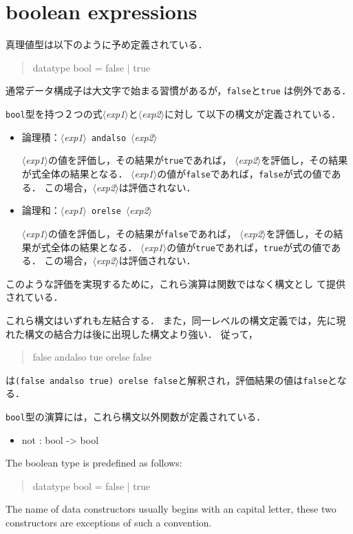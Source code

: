 \documentclass{jbook}
\newcommand{\txt}[2]{#2}
\newcommand{\code}[1]{\mbox{\large\tt #1}}
\newcommand{\nonterm}[1]{\mbox{$\langle$}{\it #1}\mbox{$\rangle$}}
\newcommand{\term}[1]{\mbox{{\tt #1}}}
\newenvironment{program}{\begin{quote}\begin{tt}}%
                        {\end{tt}\end{quote}}
\begin{document}
\section{\txt{論理演算式}{boolean expressions}}

\ifjp%
	真理値型は以下のように予め定義されている．
\begin{program}
datatype bool = false | true
\end{program}
通常データ構成子は大文字で始まる習慣があるが，\code{false}と\code{true}
は例外である．

	\code{bool}型を持つ２つの式\nonterm{exp1}と\nonterm{exp2}に対し
て以下の構文が定義されている．
\begin{itemize}
\item 論理積：\nonterm{exp1}\ \term{andalso}\ \nonterm{exp2} 

\nonterm{exp1}の値を評価し，その結果が\code{true}であれば，
\nonterm{exp2}を評価し，その結果が式全体の結果となる．
\nonterm{exp1}の値が\code{false}であれば，\code{false}が式の値である．
	この場合，\nonterm{exp2}は評価されない．

\item 論理和：\nonterm{exp1}\ \term{orelse}\ \nonterm{exp2}

	\nonterm{exp1}の値を評価し，その結果が\code{false}であれば，
\nonterm{exp2}を評価し，その結果が式全体の結果となる．
\nonterm{exp1}の値が\code{true}であれば，\code{true}が式の値である．
	この場合，\nonterm{exp2}は評価されない．
\end{itemize}
	このような評価を実現するために，これら演算は関数ではなく構文とし
て提供されている．

	これら構文はいずれも左結合する．
	また，同一レベルの構文定義では，先に現れた構文の結合力は後に出現した構文より強い．
	従って，
\begin{program}
false andalso tue orelse false
\end{program}
は\code{(false andalso true) orelse false}と解釈され，評価結果の値は\code{false}となる．

	\code{bool}型の演算には，これら構文以外関数が定義されている．
\begin{itemize}
\item not : bool -> bool
\end{itemize}
\else%
	The boolean type is predefined as follows:
\begin{program}
datatype bool = false | true
\end{program}
	The name of data constructors usually begins with an capital
letter, these two constructors are exceptions of such a convention.
\end{document}
